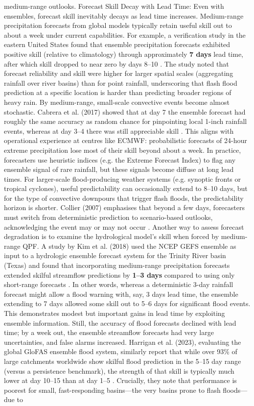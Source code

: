 medium-range outlooks. Forecast Skill Decay with Lead Time: Even with ensembles, forecast skill inevitably decays as lead time increases. Medium-range precipitation forecasts from global models typically retain useful skill out to about a week under current capabilities. For example, a verification study in the eastern United States found that ensemble precipitation forecasts exhibited positive skill (relative to climatology) through approximately \textbf{7 days} lead time, after which skill dropped to near zero by days 8–10 \citep{Cabrera2017}. The study noted that forecast reliability and skill were higher for larger spatial scales (aggregating rainfall over river basins) than for point rainfall, underscoring that flash flood prediction at a specific location is harder than predicting broader regions of heavy rain. By medium-range, small-scale convective events become almost stochastic. Cabrera et al. (2017) showed that at day 7 the ensemble forecast had roughly the same accuracy as random chance for pinpointing local 1-inch rainfall events, whereas at day 3–4 there was still appreciable skill \citep{Cabrera2017}. This aligns with operational experience at centres like ECMWF: probabilistic forecasts of 24-hour extreme precipitation lose most of their skill beyond about a week. In practice, forecasters use heuristic indices (e.g. the Extreme Forecast Index) to flag any ensemble signal of rare rainfall, but these signals become diffuse at long lead times. For larger-scale flood-producing weather systems (e.g. synoptic fronts or tropical cyclones), useful predictability can occasionally extend to 8–10 days, but for the type of convective downpours that trigger flash floods, the predictability horizon is shorter. Collier (2007) emphasises that beyond a few days, forecasters must switch from deterministic prediction to scenario-based outlooks, acknowledging the event may or may not occur \citep{Collier2007}. Another way to assess forecast degradation is to examine the hydrological model's skill when forced by medium-range QPF. A study by Kim et al. (2018) used the NCEP GEFS ensemble as input to a hydrologic ensemble forecast system for the Trinity River basin (Texas) and found that incorporating medium-range precipitation forecasts extended skilful streamflow predictions by \textbf{1–3 days} compared to using only short-range forecasts \citep{Kim2018}. In other words, whereas a deterministic 3-day rainfall forecast might allow a flood warning with, say, 3 days lead time, the ensemble extending to 7 days allowed some skill out to 5–6 days for significant flood events. This demonstrates modest but important gains in lead time by exploiting ensemble information. Still, the accuracy of flood forecasts declined with lead time; by a week out, the ensemble streamflow forecasts had very large uncertainties, and false alarms increased. Harrigan et al. (2023), evaluating the global GloFAS ensemble flood system, similarly report that while over 93\% of large catchments worldwide show skilful flood prediction in the 5–15 day range (versus a persistence benchmark), the strength of that skill is typically much lower at day 10–15 than at day 1–5 \citep{Harrigan2023}. Crucially, they note that performance is poorest for small, fast-responding basins—the very basins prone to flash floods—due to 